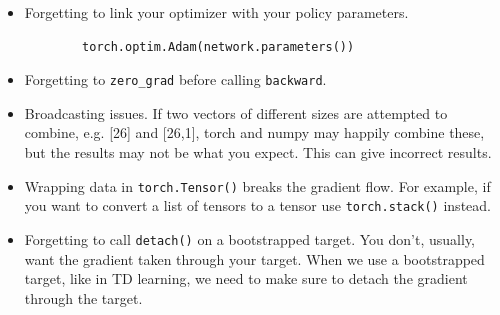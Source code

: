 \documentclass{article}
\begin{document}
\begin{itemize}
    \item Forgetting to link your optimizer with your policy parameters.
    \begin{verbatim}
        torch.optim.Adam(network.parameters())
    \end{verbatim}
    \item Forgetting to \verb|zero_grad| before calling \verb|backward|.
    \item Broadcasting issues. If two vectors of different sizes are attempted to combine, e.g. [26] and [26,1], torch and numpy may happily combine these, but the results may not be what you expect. This can give incorrect results.
    \item Wrapping data in \verb|torch.Tensor()| breaks the gradient flow. For example, if you want to convert a list of tensors to a tensor use \verb|torch.stack()| instead.
    \item Forgetting to call \verb|detach()| on a bootstrapped target. You don't, usually, want the gradient taken through your target. When we use a bootstrapped target, like in TD learning, we need to make sure to detach the gradient through the target.
\end{itemize}
\end{document}
